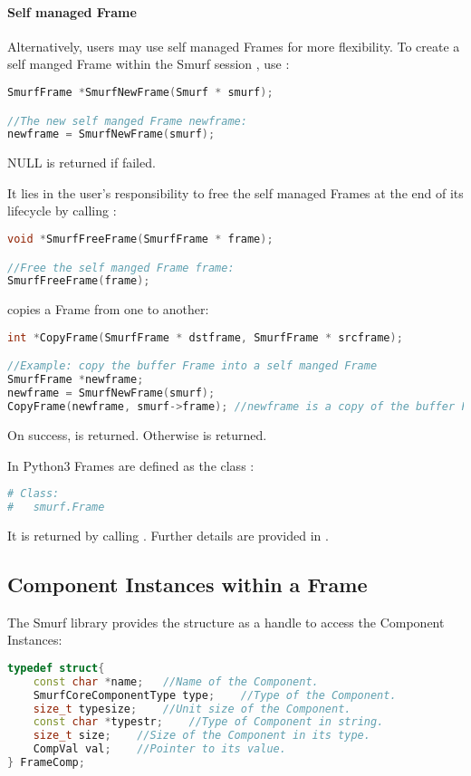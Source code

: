 \paragraph{Self managed Frame}
Alternatively, users may use self managed Frames for more flexibility. To create a self manged Frame within the Smurf session , use :
\begin{lstlisting}[language=C++, caption={SmurfNewFrame()\label{api:SmurfNewFrameC}}]
SmurfFrame *SmurfNewFrame(Smurf * smurf);

//The new self manged Frame newframe:
newframe = SmurfNewFrame(smurf);
\end{lstlisting}
NULL is returned if  failed.

It lies in the user's responsibility to free the self managed Frames at the end of its lifecycle by calling :
\begin{lstlisting}[language=C++, caption={SmurfFreeFrame()\label{api:SmurfFreeFrameC}}]
void *SmurfFreeFrame(SmurfFrame * frame);

//Free the self manged Frame frame:
SmurfFreeFrame(frame);
\end{lstlisting}

 copies a Frame from one to another:
\begin{lstlisting}[language=C++, caption={CopyFrame()\label{api:CopyFrameC}}]
int *CopyFrame(SmurfFrame * dstframe, SmurfFrame * srcframe);

//Example: copy the buffer Frame into a self manged Frame
SmurfFrame *newframe;
newframe = SmurfNewFrame(smurf);
CopyFrame(newframe, smurf->frame); //newframe is a copy of the buffer Frame.
\end{lstlisting}
On success,  is returned. Otherwise  is returned.

In Python3 Frames are defined as the class :
\begin{lstlisting}[language=Python,caption={smurf.Frame\label{api:FrameP}}]
# Class:
#	smurf.Frame
\end{lstlisting}

It is returned by calling . Further details are provided in .


\subsection{Component Instances within a Frame\label{sec:FrameAPIsC}}
The Smurf library provides the  structure as a handle to access the Component Instances:
\begin{lstlisting}[language=C++, caption={struct FrameComp\label{api:FrameCompC}}]
typedef struct{
	const char *name;	//Name of the Component.
	SmurfCoreComponentType type;	//Type of the Component.
	size_t typesize;	//Unit size of the Component.
	const char *typestr;	//Type of Component in string.
	size_t size;	//Size of the Component in its type.
	CompVal val;	//Pointer to its value.
} FrameComp;
\end{lstlisting}


